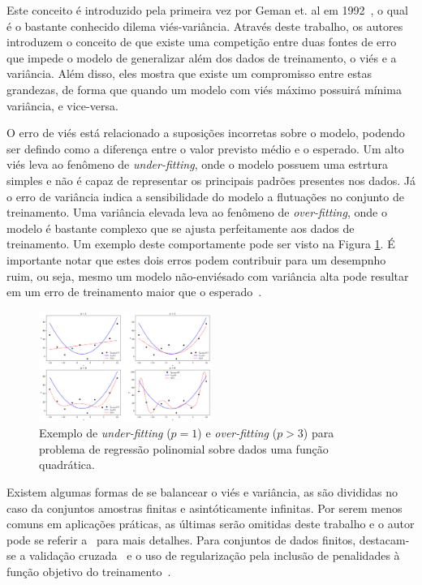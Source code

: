 \documentclass[conference]{IEEEtran}
\begin{document}
    Este conceito é introduzido pela primeira vez por Geman et. al em 1992~\cite{geman1992neural}, o qual é o bastante conhecido dilema viés-variância. Através deste trabalho, os autores introduzem o conceito de que existe uma competição entre duas fontes de erro que impede o modelo de generalizar além dos dados de treinamento, o viés e a variância. Além disso, eles mostra que existe um compromisso entre estas grandezas, de forma que quando um modelo com viés máximo possuirá mínima variância, e vice-versa.
    
    O erro de viés está relacionado a suposições incorretas sobre o modelo, podendo ser defindo como a diferença entre o valor previsto médio e o esperado. Um alto viés leva ao fenômeno de \textit{under-fitting}, onde o modelo possuem uma estrtura simples e não é capaz de representar os principais padrões presentes nos dados. Já o erro de variância indica a sensibilidade do modelo a flutuações no conjunto de treinamento. Uma variância elevada leva ao fenômeno de \textit{over-fitting}, onde o modelo é bastante complexo que se ajusta perfeitamente aos dados de treinamento. Um exemplo deste comportamente pode ser visto na Figura \ref{fig:bias-var}. É importante notar que estes dois erros podem contribuir para um desempnho ruim, ou seja, mesmo um modelo não-enviésado com variância alta pode resultar em um erro de treinamento maior que o esperado~\cite{geman1992neural}.
    
    \begin{figure}[thpbh]
    	\centering
    	\includegraphics[width=0.5\textwidth]{bias-var-example.png}
	    \caption{Exemplo de \textit{under-fitting} ($p=1$) e \textit{over-fitting} ($p > 3$) para problema de regressão polinomial sobre dados uma função quadrática.}
	    \label{fig:bias-var}
    \end{figure}
    
	Existem algumas formas de se balancear o viés e variância, as são divididas no caso da conjuntos amostras finitas e asintóticamente infinitas. Por serem menos comuns em aplicações práticas, as últimas serão omitidas deste trabalho e o autor pode se referir a~\cite{geman1992neural} para mais detalhes. Para conjuntos de dados finitos, destacam-se a validação cruzada~\cite{arlot2010survey} e o uso de regularização pela inclusão de penalidades à função objetivo do treinamento~\cite{girosi1995regularization}.  
	
\end{document}

